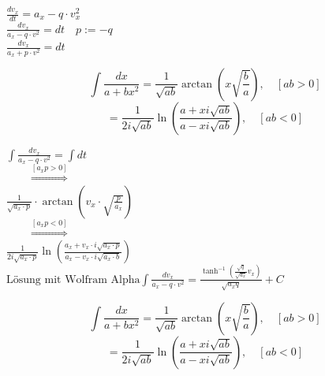 $\displaystyle \frac{dv_x}{dt} = a_x - q \cdot v_x^2$\\[6pt]
$\displaystyle \frac{dv_x}{a_x - q \cdot v^2} = dt \quad  p := -q$\\[6pt]
$\displaystyle\frac{dv_x}{a_x + p \cdot v^2} = dt$\\[6pt]
\begin{figure}
	\vspace{-8pt} %
	\begin{minipage}{0.59\textwidth}
		\begin{tcolorbox}[
			title={Gradshteyn \& Ryzhik, 7.\ Aufl., §2.124},%
		fonttitle=\bfseries\footnotesize,   
		fontupper=\footnotesize,            
		colback=white,
		colframe=gray!60!black,
		fonttitle=\bfseries,
		boxrule=0.4pt
		]
		\[
		\int \frac{dx}{a + bx^2}
		= \frac{1}{\sqrt{ab}} \arctan\!\left(x\sqrt{\frac{b}{a}}\right),
		\quad [ab>0]
		\]
		\[
		= \frac{1}{2i\sqrt{ab}}
		\ln\!\left(\frac{a + xi\sqrt{ab}}{a - xi\sqrt{ab}}\right),
		\quad [ab<0]
		\]
	\end{tcolorbox}
\end{minipage}
\vspace{-6pt}
\end{figure}
$\displaystyle \int \frac{dv_x}{a_x - q \cdot v^2} = \int dt$\\[6pt]
$\displaystyle \qquad \overset{[a_x p >0]}{\Longrightarrow} $\\[8pt]
$\displaystyle \frac{1}{\sqrt{a_x\cdot p}}\cdot \arctan\!\left(v_x\cdot \sqrt{\frac{p}{a_x}}\right)$\\[10pt]
$\displaystyle \qquad \overset{[a_x p <0]}{\Longrightarrow} $\\[8pt]
$\displaystyle \frac{1}{2i\sqrt{a_x\cdot p}}
\ln\!\left(\frac{a_x + v_x\cdot i\sqrt{a_x \cdot p}}{a_x - v_x\cdot i\sqrt{a_x \cdot b}}\right)$\\[4pt]
$\displaystyle \text{Lösung mit Wolfram Alpha} \int \frac{dv_x}{a_x - q \cdot v^2} 
= \frac{\tanh^{-1}\!\left(\frac{\sqrt{q}}{\sqrt{a_x}} v_x\right)}{\sqrt{a_x q}} + C$\\





\iffalse
\begin{tcolorbox}[
	title={Gradshteyn \& Ryzhik, 7.\ Aufl., §2.124},
	colback=white,
	colframe=gray!60!black,
	fonttitle=\bfseries
	]
	\[
	\int \frac{dx}{a + bx^2}
	= \frac{1}{\sqrt{ab}} \arctan\!\left(x\sqrt{\frac{b}{a}}\right),
	\quad [ab>0]
	\]
	\[
	= \frac{1}{2i\sqrt{ab}}
	\ln\!\left(\frac{a + xi\sqrt{ab}}{a - xi\sqrt{ab}}\right),
	\quad [ab<0]
	\]
\end{tcolorbox}


